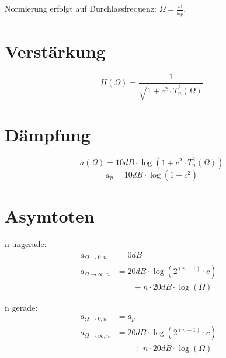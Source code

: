 \documentclass[a4paper, 12pt]{report}
\begin{document}
	Normierung erfolgt auf Durchlassfrequenz: $ \Omega = \frac{\omega}{\omega_p} $.
	\vspace{0.5cm}

    \begin{minipage}[t]{0.5\textwidth}
		\section*{Verstärkung}
	    	\[ H(\Omega) = \frac{1}{\sqrt{1 + c^2 \cdot T^2_n(\Omega)}} \]
    \end{minipage}
    \begin{minipage}[t]{0.5\textwidth}
		\section*{Dämpfung}
		    \[ a(\Omega) = 10dB \cdot \log{\left(1 + c^2 \cdot T^2_n(\Omega)\right)} \]
		   	\[ a_p = 10dB \cdot \log{\left(1+c^2\right)} \]
    \end{minipage}
	
	\vspace{-0.5cm}  
	
\section*{Asymtoten}
    \begin{minipage}[t]{0.5\textwidth}
		n ungerade:
		\begin{align*}
		 	a_{\Omega\rightarrow 0,n} &= 0dB &\\
		 	a_{\Omega\rightarrow \infty,n} &= 20dB \cdot \log{\left(2^{(n-1)} \cdot c\right)} &\\ &\qquad + n \cdot 20dB \cdot \log{(\Omega)} &
		\end{align*}
    \end{minipage}
    \begin{minipage}[t]{0.5\textwidth}
		n gerade:
		\begin{align*}
		 	a_{\Omega\rightarrow 0,n} &= a_p &\\
		 	a_{\Omega\rightarrow \infty,n} &= 20dB \cdot \log{\left(2^{(n-1)} \cdot c\right)} &\\ &\qquad + n \cdot 20dB \cdot \log{(\Omega)} &
		\end{align*}
    \end{minipage}
    
\vspace{0.8cm}
    
\end{document}
